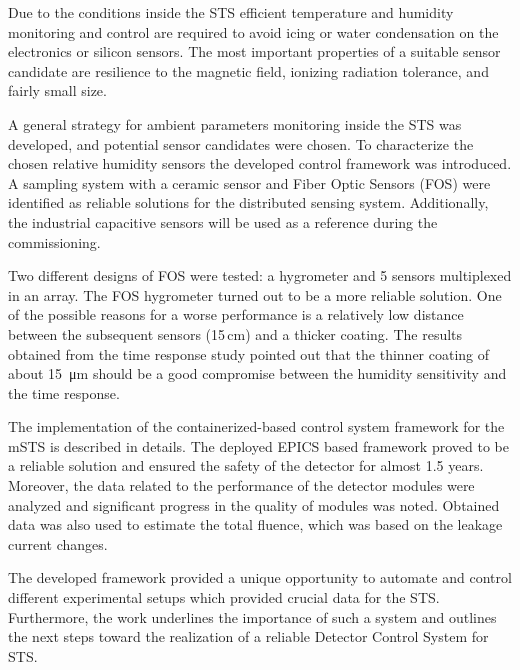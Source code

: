 Due to the conditions inside the \gls{STS} efficient temperature and humidity monitoring and control are required to avoid icing or water condensation on the electronics or silicon sensors. The most important properties of a suitable sensor candidate are resilience to the magnetic field, ionizing radiation tolerance, and fairly small size.

A general strategy for ambient parameters monitoring inside the \gls{STS} was developed, and potential sensor candidates were chosen. To characterize the chosen relative humidity sensors the developed control framework was introduced. A sampling system with a ceramic sensor and Fiber Optic Sensors (\gls{FOS}) were identified as reliable solutions for the distributed sensing system. Additionally, the industrial capacitive sensors will be used as a reference during the commissioning.

Two different designs of \gls{FOS} were tested: a hygrometer and 5 sensors multiplexed in an array. The \gls{FOS} hygrometer turned out to be a more reliable solution. One of the possible reasons for a worse performance is a relatively low distance between the subsequent sensors (15\,cm) and a thicker coating. The results obtained from the time response study pointed out that the thinner coating of about \SI{15}{\micro\metre} should be a good compromise between the humidity sensitivity and the time response. 

The implementation of the containerized-based control system framework for the \gls{mSTS} is described in details. The deployed EPICS based framework proved to be a reliable solution and ensured the safety of the detector for almost 1.5 years. Moreover, the data related to the performance of the detector modules were analyzed and significant progress in the quality of modules was noted. Obtained data was also used to estimate the total fluence, which was based on the leakage current changes. 

The developed framework provided a unique opportunity to automate and control different experimental setups which provided crucial data for the \gls{STS}. Furthermore, the work underlines the importance of such a system and outlines the next steps toward the realization of a reliable Detector Control System for \gls{STS}.